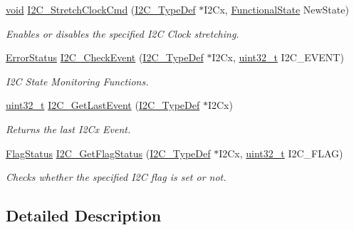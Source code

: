 \begin{DoxyCompactItemize}
\hyperlink{usb__devapi_8h_afabf60e7f57651d6d595a02c75f07cd0}{void} \hyperlink{group___i2_c___exported___functions_ga7459feb3b1dfcd3e4f6574002ca7d3bd}{I2\+C\+\_\+\+Stretch\+Clock\+Cmd} (\hyperlink{struct_i2_c___type_def}{I2\+C\+\_\+\+Type\+Def} $\ast$I2\+Cx, \hyperlink{agilefox_2library_2inc_2stm32f10x__type_8h_ac9a7e9a35d2513ec15c3b537aaa4fba1}{Functional\+State} New\+State)
\begin{DoxyCompactList}\small\item\em Enables or disables the specified I2C Clock stretching. \end{DoxyCompactList}\item 
\hyperlink{agilefox_2library_2inc_2stm32f10x__type_8h_a8333b96c67f83cba354b3407fcbb6ee8}{Error\+Status} \hyperlink{group___i2_c___exported___functions_ga2d5701342f9d4c1f09bf9d3cdcacc326}{I2\+C\+\_\+\+Check\+Event} (\hyperlink{struct_i2_c___type_def}{I2\+C\+\_\+\+Type\+Def} $\ast$I2\+Cx, \hyperlink{_p_e___types_8h_a33594304e786b158f3fb30289278f5af}{uint32\+\_\+t} I2\+C\+\_\+\+E\+V\+E\+NT)
\begin{DoxyCompactList}\small\item\em I2C State Monitoring Functions. \end{DoxyCompactList}\item 
\hyperlink{_p_e___types_8h_a33594304e786b158f3fb30289278f5af}{uint32\+\_\+t} \hyperlink{group___i2_c___exported___functions_ga29237aea9b5a3ead33167e1d027e9f1a}{I2\+C\+\_\+\+Get\+Last\+Event} (\hyperlink{struct_i2_c___type_def}{I2\+C\+\_\+\+Type\+Def} $\ast$I2\+Cx)
\begin{DoxyCompactList}\small\item\em Returns the last I2\+Cx Event. \end{DoxyCompactList}\item 
\hyperlink{agilefox_2library_2inc_2stm32f10x__type_8h_a89136caac2e14c55151f527ac02daaff}{Flag\+Status} \hyperlink{group___i2_c___exported___functions_ga15c95d0ed124f029621a2061b1677ee7}{I2\+C\+\_\+\+Get\+Flag\+Status} (\hyperlink{struct_i2_c___type_def}{I2\+C\+\_\+\+Type\+Def} $\ast$I2\+Cx, \hyperlink{_p_e___types_8h_a33594304e786b158f3fb30289278f5af}{uint32\+\_\+t} I2\+C\+\_\+\+F\+L\+AG)
\begin{DoxyCompactList}\small\item\em Checks whether the specified I2C flag is set or not. \end{DoxyCompactList}\end{DoxyCompactItemize}


\subsection{Detailed Description}


